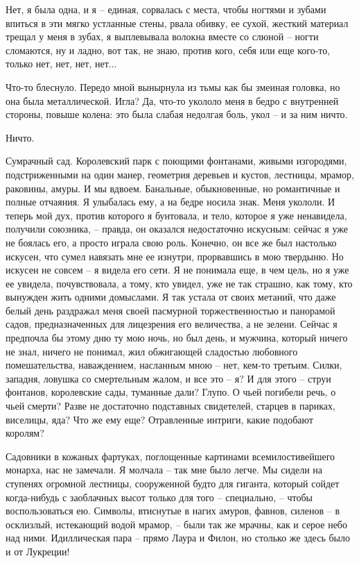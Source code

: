 Нет,  я  была  одна,  и я -- единая, сорвалась с места, чтобы ногтями и
зубами впиться в эти мягко устланные стены, рвала обивку, ее сухой,  жесткий
материал  трещал  у  меня в зубах, я выплевывала волокна вместе со слюной --
ногти сломаются, ну и ладно, вот так, не знаю, против  кого,  себя  или  еще
кого-то, только нет, нет, нет, нет...

Что-то  блеснуло. Передо мной вынырнула из тьмы как бы змеиная головка,
но она  была  металлической.  Игла?  Да,  что-то  укололо  меня  в  бедро  с
внутренней  стороны, повыше колена: это была слабая недолгая боль, укол -- и
за ним ничто.

Ничто.

Сумрачный сад. Королевский парк с поющими фонтанами, живыми изгородями,
подстриженными на один манер, геометрия деревьев и кустов, лестницы, мрамор,
раковины, амуры. И мы вдвоем.  Банальные,  обыкновенные,  но  романтичные  и
полные  отчаяния.  Я  улыбалась ему, а на бедре носила знак. Меня укололи. И
теперь мой  дух,  против  которого  я  бунтовала,  и  тело,  которое  я  уже
ненавидела, получили союзника, -- правда, он оказался недостаточно искусным:
сейчас  я  уже не боялась его, а просто играла свою роль. Конечно, он все же
был настолько искусен, что сумел навязать мне ее изнутри, прорвавшись в  мою
твердыню.  Но  искусен  не совсем -- я видела его сети. Я не понимала еще, в
чем цель, но я уже ее увидела, почувствовала, а тому, кто увидел, уже не так
страшно, как тому, кто вынужден жить одними домыслами. Я так устала от своих
метаний, что даже белый день раздражал меня своей пасмурной торжественностью
и панорамой садов, предназначенных  для  лицезрения  его  величества,  а  не
зелени. Сейчас я предпочла бы этому дню ту мою ночь, но был день, и мужчина,
который  ничего  не  знал,  ничего  не  понимал,  жил  обжигающей  сладостью
любовного  помешательства,  наваждением,  насланным  мною  --  нет,   кем-то
третьим. Силки, западня, ловушка со смертельным жалом, и все это -- я? И для
этого  --  струи  фонтанов,  королевские  сады, туманные дали? Глупо. О чьей
погибели речь, о чьей смерти? Разве  не  достаточно  подставных  свидетелей,
старцев в париках, виселицы, яда? Что же ему еще? Отравленные интриги, какие
подобают королям?

Садовники  в  кожаных   фартуках,  поглощенные  картинами  всемилостивейшего
монарха, нас  не замечали.  Я молчала --  так мне было  легче. Мы  сидели на
ступенях огромной  лестницы, сооруженной  будто для гиганта,  который сойдет
когда-нибудь  с заоблачных  высот только  для того  -- специально,  -- чтобы
воспользоваться ею. Символы, втиснутые в  нагих амуров, фавнов, силенов -- в
осклизлый, истекающий водой мрамор, -- были  так же мрачны, как и серое небо
над ними. Идиллическая пара -- прямо Лаура и Филон, но столько же здесь было
и от Лукреции!

